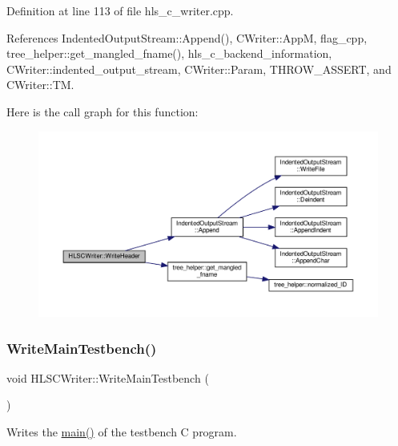 Definition at line 113 of file hls\+\_\+c\+\_\+writer.\+cpp.



References Indented\+Output\+Stream\+::\+Append(), C\+Writer\+::\+AppM, flag\+\_\+cpp, tree\+\_\+helper\+::get\+\_\+mangled\+\_\+fname(), hls\+\_\+c\+\_\+backend\+\_\+information, C\+Writer\+::indented\+\_\+output\+\_\+stream, C\+Writer\+::\+Param, T\+H\+R\+O\+W\+\_\+\+A\+S\+S\+E\+RT, and C\+Writer\+::\+TM.

Here is the call graph for this function\+:
\nopagebreak
\begin{figure}[H]
\begin{center}
\leavevmode
\includegraphics[width=350pt]{d4/db1/classHLSCWriter_ac7015936ef0ed0f6c31f8d7d4c3bd7fa_cgraph}
\end{center}
\end{figure}
\mbox{\label{classHLSCWriter_a169bdc6b181d083f9e4eb033f2da65da}} 
\subsubsection{\texorpdfstring{Write\+Main\+Testbench()}{WriteMainTestbench()}}
{\footnotesize\ttfamily void H\+L\+S\+C\+Writer\+::\+Write\+Main\+Testbench (\begin{DoxyParamCaption}{ }\end{DoxyParamCaption})\hspace{0.3cm}{\ttfamily [protected]}}



Writes the \hyperlink{test__degree__coloring_8cpp_a0ddf1224851353fc92bfbff6f499fa97}{main()} of the testbench C program. 



